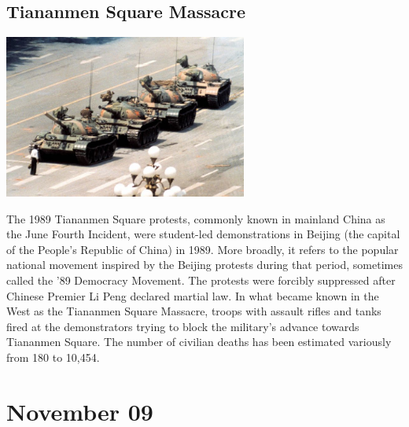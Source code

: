 \documentclass[11pt]{report}
\begin{document}
\subsection{Tiananmen Square Massacre}
\vspace{2mm}\begin{center}\includegraphics[width=8cm]{./img/tiananmenMassacre.jpg}\end{center}
The 1989 Tiananmen Square protests, commonly known in mainland China as the June Fourth Incident, were student-led demonstrations in Beijing (the capital of the People's Republic of China) in 1989. More broadly, it refers to the popular national movement inspired by the Beijing protests during that period, sometimes called the '89 Democracy Movement. The protests were forcibly suppressed after Chinese Premier Li Peng declared martial law. In what became known in the West as the Tiananmen Square Massacre, troops with assault rifles and tanks fired at the demonstrators trying to block the military's advance towards Tiananmen Square. The number of civilian deaths has been estimated variously from 180 to 10,454.
\section{November 09}
\end{document}

